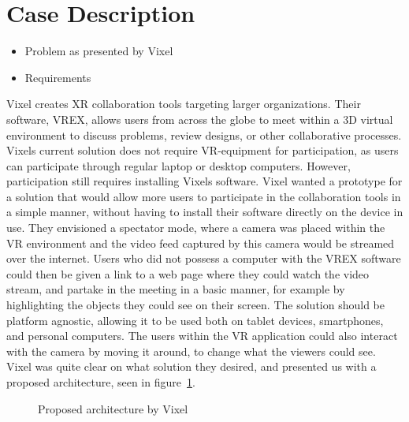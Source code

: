 \section{Case Description}
\begin{itemize}
    \item Problem as presented by Vixel
    \item Requirements \end{itemize}

Vixel\cite{vixel} creates XR collaboration tools targeting larger organizations. Their software, VREX\cite{vrex}, allows users from across the globe to meet within a 3D virtual environment to discuss problems, review designs, or other collaborative processes. Vixels current solution does not require VR-equipment for participation, as users can participate through regular laptop or desktop computers. However, participation still requires installing Vixels software. 
Vixel wanted a prototype for a solution that would allow more users to participate in the collaboration tools in a simple manner, without having to install their software directly on the device in use. They envisioned a spectator mode, where a camera was placed within the VR environment and the video feed captured by this camera would be streamed over the internet.  Users who did not possess a computer with the VREX software could then be given a link to a web page where they could watch the video stream, and partake in the meeting in a basic manner, for example by highlighting the objects they could see on their screen. The solution should be platform agnostic, allowing it to be used both on tablet devices, smartphones, and personal computers. The users within the VR application could also interact with the camera by moving it around, to change what the viewers could see.
Vixel was quite clear on what solution they desired, and presented us with a proposed architecture, seen in figure~\ref{fig:proposed_architecture}.

\begin{figure}
    \caption{Proposed architecture by Vixel}
    \label{fig:proposed_architecture}
\end{figure}

